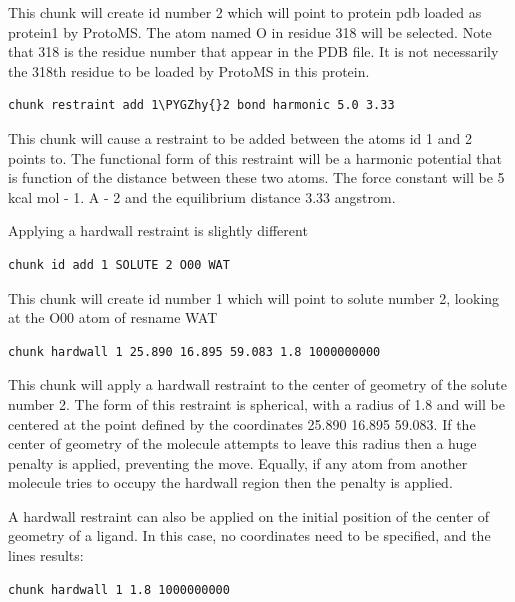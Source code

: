\documentclass[letterpaper,10pt,english]{sphinxmanual}
\def\PYGZhy{\char`\-}
\begin{document}
This chunk will create id number 2 which will point to protein pdb loaded as protein1 by ProtoMS. The atom named O in residue 318 will be selected. Note that 318 is the residue number that appear in the PDB file. It is not necessarily the 318th residue to be loaded by ProtoMS in this protein.

\begin{Verbatim}[commandchars=\\\{\}]
chunk restraint add 1\PYGZhy{}2 bond harmonic 5.0 3.33
\end{Verbatim}

This chunk will cause a restraint to be added between the atoms id 1 and 2 points to. The functional form of this restraint will be a harmonic potential that is function of the distance between these two atoms. The force constant will be 5 kcal mol - 1. A - 2 and the equilibrium distance 3.33 angstrom.

Applying a hardwall restraint is slightly different

\begin{Verbatim}[commandchars=\\\{\}]
chunk id add 1 SOLUTE 2 O00 WAT
\end{Verbatim}

This chunk will create id number 1 which will point to solute number 2, looking at the O00 atom of resname WAT

\begin{Verbatim}[commandchars=\\\{\}]
chunk hardwall 1 25.890 16.895 59.083 1.8 1000000000
\end{Verbatim}

This chunk will apply a hardwall restraint to the center of geometry of the solute number 2. The form of this restraint is spherical, with a radius of 1.8 and will be centered at the point defined by the coordinates 25.890 16.895 59.083. If the center of geometry of the molecule attempts to leave this radius then a huge penalty is applied, preventing the move. Equally, if any atom from another molecule tries to occupy the hardwall region then the penalty is applied.

A hardwall restraint can also be applied on the initial position of the center of geometry of a ligand. In this case, no coordinates need to be specified, and the lines results:

\begin{Verbatim}[commandchars=\\\{\}]
chunk hardwall 1 1.8 1000000000
\end{Verbatim}
\end{document}
